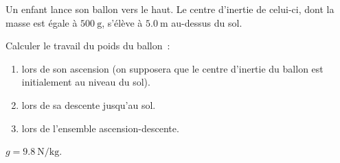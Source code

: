 Un enfant lance son ballon vers le haut. Le centre d'inertie de celui-ci, dont
la masse est égale à $\qty{500}{\g}$, s'élève à $\qty{5.0}{\m}$ au-dessus du
sol.

Calculer le travail du poids du ballon~:
\begin{enumerate}
    \item lors de son ascension (on supposera que le centre d'inertie du ballon
          est initialement au niveau du sol).
    \item lors de sa descente jusqu'au sol.
    \item lors de l'ensemble ascension-descente.
\end{enumerate}

\begin{donnees}
    $g=\qty{9.8}{\N\per\kg}$.
\end{donnees}
